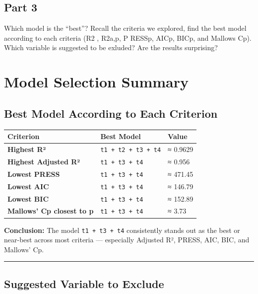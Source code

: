 \documentclass[
]{article}
\begin{document}
\subsection{Part 3}\label{part-3}

Which model is the ``best''? Recall the criteria we explored, find the
best model according to each criteria (R2 , R2a,p, P RESSp, AICp, BICp,
and Mallows Cp). Which variable is suggested to be exluded? Are the
results surprising?

\section{Model Selection Summary}\label{model-selection-summary}

\subsection{Best Model According to Each
Criterion}\label{best-model-according-to-each-criterion}

\begin{longtable}[]{@{}lll@{}}
\toprule\noalign{}
\textbf{Criterion} & \textbf{Best Model} & \textbf{Value} \\
\midrule\noalign{}
\endhead
\bottomrule\noalign{}
\endlastfoot
\textbf{Highest R²} & \texttt{t1\ +\ t2\ +\ t3\ +\ t4} & ≈ 0.9629 \\
\textbf{Highest Adjusted R²} & \texttt{t1\ +\ t3\ +\ t4} & ≈ 0.956 \\
\textbf{Lowest PRESS} & \texttt{t1\ +\ t3\ +\ t4} & ≈ 471.45 \\
\textbf{Lowest AIC} & \texttt{t1\ +\ t3\ +\ t4} & ≈ 146.79 \\
\textbf{Lowest BIC} & \texttt{t1\ +\ t3\ +\ t4} & ≈ 152.89 \\
\textbf{Mallows' Cp closest to p} & \texttt{t1\ +\ t3\ +\ t4} & ≈
3.73 \\
\end{longtable}

\textbf{Conclusion:} The model \texttt{t1\ +\ t3\ +\ t4} consistently
stands out as the best or near-best across most criteria --- especially
Adjusted R², PRESS, AIC, BIC, and Mallows' Cp.

\begin{center}\rule{0.5\linewidth}{0.5pt}\end{center}

\subsection{Suggested Variable to
Exclude}\label{suggested-variable-to-exclude}
\end{document}
